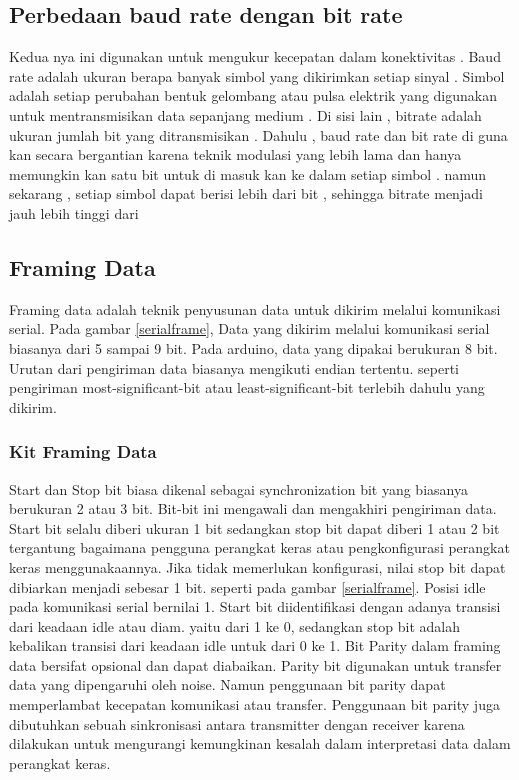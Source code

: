 \subsection{ Perbedaan baud rate dengan bit rate }
Kedua nya ini digunakan untuk mengukur kecepatan dalam konektivitas . Baud rate adalah ukuran berapa banyak simbol yang dikirimkan setiap sinyal . Simbol adalah setiap perubahan bentuk gelombang atau pulsa elektrik yang digunakan untuk mentransmisikan data sepanjang medium . Di sisi lain , bitrate adalah ukuran jumlah bit yang ditransmisikan . Dahulu , baud rate dan bit rate di guna kan secara bergantian karena teknik modulasi yang lebih lama dan  hanya memungkin kan satu bit untuk di masuk kan ke dalam setiap simbol . namun sekarang , setiap simbol dapat berisi lebih dari bit , sehingga bitrate menjadi jauh lebih tinggi dari

\subsection{Framing Data}
Framing data adalah teknik penyusunan data untuk dikirim melalui komunikasi serial. Pada gambar \ref{serialframe}, Data yang dikirim melalui komunikasi serial biasanya dari 5 sampai 9 bit. Pada arduino, data yang dipakai berukuran 8 bit. Urutan dari pengiriman data biasanya mengikuti endian tertentu. seperti pengiriman most-significant-bit atau least-significant-bit terlebih dahulu yang dikirim.
\subsubsection{Kit Framing Data}
Start dan Stop bit biasa dikenal sebagai synchronization bit yang biasanya berukuran 2 atau 3 bit. Bit-bit ini mengawali dan mengakhiri pengiriman data. Start bit selalu diberi ukuran 1 bit sedangkan stop bit dapat diberi 1 atau 2 bit tergantung bagaimana pengguna perangkat keras atau pengkonfigurasi perangkat keras menggunakaannya. Jika tidak memerlukan konfigurasi, nilai stop bit dapat dibiarkan menjadi sebesar 1 bit. seperti pada gambar \ref{serialframe}.
Posisi idle pada komunikasi serial bernilai 1. Start bit diidentifikasi dengan adanya transisi dari keadaan idle atau diam. yaitu dari 1 ke 0, sedangkan stop bit adalah kebalikan transisi dari keadaan idle untuk dari 0 ke 1.
Bit Parity dalam framing data bersifat opsional dan dapat diabaikan. Parity bit digunakan untuk transfer data yang dipengaruhi oleh noise. Namun penggunaan bit parity dapat memperlambat kecepatan komunikasi atau transfer. Penggunaan bit parity juga dibutuhkan sebuah sinkronisasi antara transmitter dengan receiver karena dilakukan untuk mengurangi kemungkinan kesalah dalam interpretasi data dalam perangkat keras.

